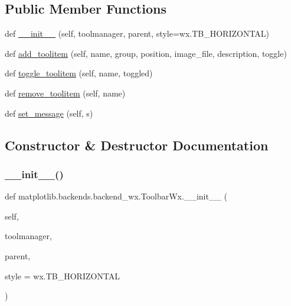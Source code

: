 \subsection*{Public Member Functions}
\begin{DoxyCompactItemize}
\item 
def \hyperlink{classmatplotlib_1_1backends_1_1backend__wx_1_1ToolbarWx_afb2fea25b696197e929dab1a63a5572c}{\+\_\+\+\_\+init\+\_\+\+\_\+} (self, toolmanager, parent, style=wx.\+T\+B\+\_\+\+H\+O\+R\+I\+Z\+O\+N\+T\+AL)
\item 
def \hyperlink{classmatplotlib_1_1backends_1_1backend__wx_1_1ToolbarWx_a1e1d6be6399447416f7097c2c283594c}{add\+\_\+toolitem} (self, name, group, position, image\+\_\+file, description, toggle)
\item 
def \hyperlink{classmatplotlib_1_1backends_1_1backend__wx_1_1ToolbarWx_a12ffc32e08cb0963a11ad88109675582}{toggle\+\_\+toolitem} (self, name, toggled)
\item 
def \hyperlink{classmatplotlib_1_1backends_1_1backend__wx_1_1ToolbarWx_ad64d3c36fbfa9ee37216516f914d6a1b}{remove\+\_\+toolitem} (self, name)
\item 
def \hyperlink{classmatplotlib_1_1backends_1_1backend__wx_1_1ToolbarWx_ac6116aaf4e1d666b0cfc2429ce18d578}{set\+\_\+message} (self, s)
\end{DoxyCompactItemize}


\subsection{Constructor \& Destructor Documentation}
\mbox{\label{classmatplotlib_1_1backends_1_1backend__wx_1_1ToolbarWx_afb2fea25b696197e929dab1a63a5572c}} 
\subsubsection{\texorpdfstring{\+\_\+\+\_\+init\+\_\+\+\_\+()}{\_\_init\_\_()}}
{\footnotesize\ttfamily def matplotlib.\+backends.\+backend\+\_\+wx.\+Toolbar\+Wx.\+\_\+\+\_\+init\+\_\+\+\_\+ (\begin{DoxyParamCaption}\item[{}]{self,  }\item[{}]{toolmanager,  }\item[{}]{parent,  }\item[{}]{style = {\ttfamily wx.TB\+\_\+HORIZONTAL} }\end{DoxyParamCaption})}



